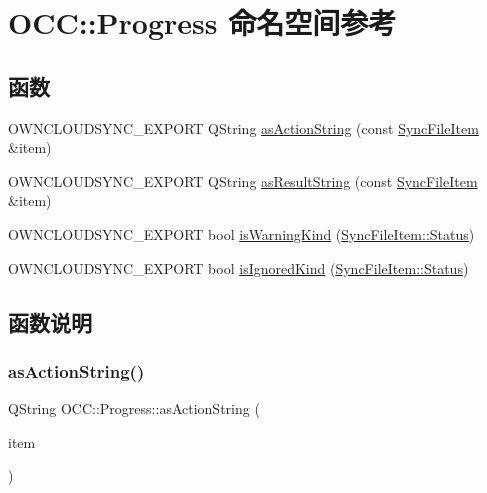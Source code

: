 \hypertarget{namespace_o_c_c_1_1_progress}{}\section{O\+CC\+:\+:Progress 命名空间参考}
\label{namespace_o_c_c_1_1_progress}
\subsection*{函数}
\begin{DoxyCompactItemize}
\item 
O\+W\+N\+C\+L\+O\+U\+D\+S\+Y\+N\+C\+\_\+\+E\+X\+P\+O\+RT Q\+String \hyperlink{namespace_o_c_c_1_1_progress_a1a478597ea1667e079ffb1b84132ec67}{as\+Action\+String} (const \hyperlink{class_o_c_c_1_1_sync_file_item}{Sync\+File\+Item} \&item)
\item 
O\+W\+N\+C\+L\+O\+U\+D\+S\+Y\+N\+C\+\_\+\+E\+X\+P\+O\+RT Q\+String \hyperlink{namespace_o_c_c_1_1_progress_a24146df35bdf4407599447bf00db46f9}{as\+Result\+String} (const \hyperlink{class_o_c_c_1_1_sync_file_item}{Sync\+File\+Item} \&item)
\item 
O\+W\+N\+C\+L\+O\+U\+D\+S\+Y\+N\+C\+\_\+\+E\+X\+P\+O\+RT bool \hyperlink{namespace_o_c_c_1_1_progress_a0fe4fb92db396bd94def14e4904ad0ff}{is\+Warning\+Kind} (\hyperlink{class_o_c_c_1_1_sync_file_item_a149ade86eddd9661587bfbc9bcbca408}{Sync\+File\+Item\+::\+Status})
\item 
O\+W\+N\+C\+L\+O\+U\+D\+S\+Y\+N\+C\+\_\+\+E\+X\+P\+O\+RT bool \hyperlink{namespace_o_c_c_1_1_progress_a66eb9514ab228df079a90b3d43b087f6}{is\+Ignored\+Kind} (\hyperlink{class_o_c_c_1_1_sync_file_item_a149ade86eddd9661587bfbc9bcbca408}{Sync\+File\+Item\+::\+Status})
\end{DoxyCompactItemize}


\subsection{函数说明}
\mbox{\label{namespace_o_c_c_1_1_progress_a1a478597ea1667e079ffb1b84132ec67}} 
\subsubsection{\texorpdfstring{as\+Action\+String()}{asActionString()}}
{\footnotesize\ttfamily Q\+String O\+C\+C\+::\+Progress\+::as\+Action\+String (\begin{DoxyParamCaption}\item[{const \hyperlink{class_o_c_c_1_1_sync_file_item}{Sync\+File\+Item} \&}]{item }\end{DoxyParamCaption})}



